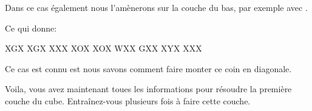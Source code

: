 Dans ce cas également nous l'amènerons sur la couche du bas, par exemple avec .
 
Ce qui donne:
 
\begin{center}
    \RubikFaceRight%
 	{X}{G}{X}%
 	{X}{G}{X}%
 	{X}{X}{X}
 	\RubikFaceFront%
 	{X}{O}{X}%
 	{X}{O}{X}%
 	{W}{X}{X}
 	\RubikFaceDown%
 	{G}{X}{X}%
 	{X}{Y}{X}%
 	{X}{X}{X}
\end{center} 


Ce cas est connu est nous savons comment faire monter ce coin en diagonale.

Voila, vous avez maintenant toues les informations pour résoudre la première
couche du cube. Entraînez-vous plusieurs fois à faire cette couche.
